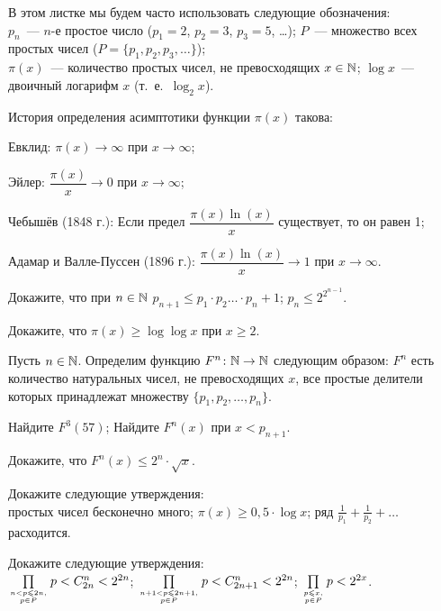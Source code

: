 \documentclass[a4paper,12pt]{article}
\begin{document}

\noindent В этом листке мы будем часто использовать следующие
обозначения:\\
$p_n$~--- $n$-е простое число ($p_1 = 2$, $p_2 = 3$, $p_3 = 5$,
\dots);
$P$~--- множество всех простых чисел ($P = \{p_1, p_2, p_3,\dots\}$);\\
$\pi(x)$~--- количество простых чисел, не превосходящих $x\in\N$;
$\log x$~--- двоичный логарифм $x$ (т.~е.~$\log_2 x$).

\medskip
История определения асимптотики функции  $\pi(x)$ такова:

\begin{nums}{-4}
\item Евклид: $\pi(x) \to \infty$ при $x \to \infty$;
\item Эйлер: $\dfrac{\pi(x)}{x} \to 0$ при $x \to \infty$;
\item \vspace*{-3mm}
Чебышёв (1848 г.): Если предел $\dfrac{\pi(x)\ln(x)}{x}$ существует, то он равен 1;
\item Адамар и Валле-Пуссен (1896 г.): $\dfrac{\pi(x)\ln(x)}{x} \to 1$ при $x \to \infty$.
\end{nums}




 Докажите, что при $n\in\N$   $p_{n + 1} \leq
p_1 \cdot p_2\dots\cdot p_n + 1$;  $p_n \leq 2^{2^{n - 1}}$.

 Докажите, что $\pi(x) \geq \log\log x$ при $x \geq 2$.

 Пусть $n\in\N$. Определим функцию $F^n\colon \N \to \N$
следующим образом: $F^n$ есть количество натуральных чисел, не
превосходящих $x$, все простые делители которых принадлежат
множеству $\{p_1,p_2,\dots,p_n\}$. 

   Найдите  $F^3(57)$;  Найдите $F^n(x)$
при $x < p_{n + 1}$. 

 Докажите, что $F^n(x) \leq 2^n \cdot \sqrt x$. 

 Докажите следующие утверждения:\\
  простых чисел бесконечно много; 
$\pi(x)\geq0{,}5\cdot\log x$;  ряд $\displaystyle{\frac1{p_1} +
\frac1{p_2} + \dots}$ расходится. 

\vspace*{-2mm}
\vspace*{-2mm}

 Докажите следующие утверждения:\\
  $\prod\limits_{n < p \leq 2n,\atop p\in P} p <
C^n_{2n} < 2^{2n}$;  $\prod\limits_{n + 1 < p \leq 2n +
1,\atop p\in P} p < C^n_{2n + 1} < 2^{2n}$; 
$\prod\limits_{p\leq x,\atop p\in P} p < 2^{2x}$.
\end{document}
